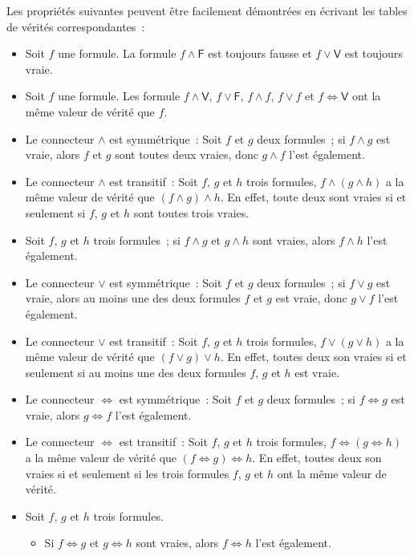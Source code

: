 Les propriétés suivantes peuvent être facilement démontrées en écrivant les tables de vérités correspondantes :
\begin{itemize}
    \item Soit $f$ une formule. La formule $f \wedge \mathsf{F}$ est toujours fausse et $f \vee \mathsf{V}$ est toujours vraie.
    \item Soit $f$ une formule. Les formule $f \wedge \mathsf{V}$, $f \vee \mathsf{F}$, $f \wedge f$, $f \vee f$ et $f \Leftrightarrow \mathsf{V}$ ont la même valeur de vérité que $f$.
    \item Le connecteur $\wedge$ est symmétrique : Soit $f$ et $g$ deux formules ; si $f \wedge g$ est vraie, alors $f$ et $g$ sont toutes deux vraies, donc $g \wedge f$ l'est également.
    \item Le connecteur $\wedge$ est transitif : Soit $f$, $g$ et $h$ trois formules, $f \wedge (g \wedge h)$ a la même valeur de vérité que $(f \wedge g) \wedge h$. En effet, toute deux sont vraies si et seulement si $f$, $g$ et $h$ sont toutes trois vraies.
    \item Soit $f$, $g$ et $h$ trois formules ; si $f \wedge g$ et $g \wedge h$ sont vraies, alors $f \wedge h$ l'est également.
    \item Le connecteur $\vee$ est symmétrique : Soit $f$ et $g$ deux formules ; si $f \vee g$ est vraie, alors au moins une des deux formules $f$ et $g$ est vraie, donc $g \vee f$ l'est également.
    \item Le connecteur $\vee$ est transitif : Soit $f$, $g$ et $h$ trois formules, $f \vee (g \vee h)$ a la même valeur de vérité que $(f \vee g) \vee h$. En effet, toutes deux son vraies si et seulement si au moins une des deux formules $f$, $g$ et $h$ est vraie.
    \item Le connecteur $\Leftrightarrow$ est symmétrique : Soit $f$ et $g$ deux formules ; si $f \Leftrightarrow g$ est vraie, alors $g \Leftrightarrow f$ l'est également.
    \item Le connecteur $\Leftrightarrow$ est transitif : Soit $f$, $g$ et $h$ trois formules, $f \Leftrightarrow (g \Leftrightarrow h)$ a la même valeur de vérité que $(f \Leftrightarrow g) \Leftrightarrow h$. En effet, toutes deux son vraies si et seulement si les trois formules $f$, $g$ et $h$ ont la même valeur de vérité.
    \item Soit $f$, $g$ et $h$ trois formules. 
        \begin{itemize}[nosep]
            \item Si $f \Leftrightarrow g$ et $g \Leftrightarrow h$ sont vraies, alors $f \Leftrightarrow h$ l'est également. 

\end{itemize}
\end{itemize}
